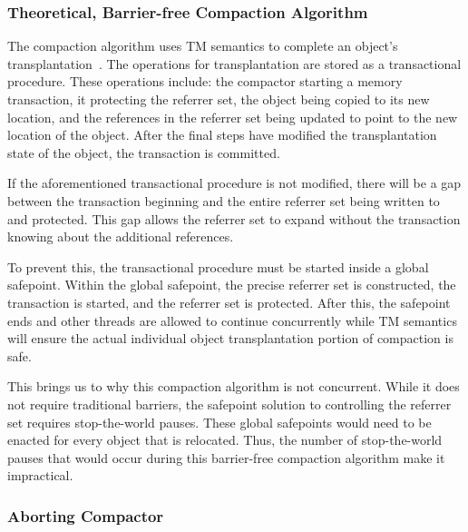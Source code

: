\documentclass{sig-alternate}
\begin{document}
\subsubsection{Theoretical, Barrier-free Compaction Algorithm}
\label{sec:collieAlgorithmNoBarriers}

The compaction algorithm uses TM semantics to complete an object's
transplantation~\cite{Iyengar:Collie}. The operations for transplantation are stored as a
transactional procedure. These operations include: the compactor 
starting a memory transaction, it protecting the referrer set, 
the object being copied to its new location, and the references in the 
referrer set being updated to point to the new location of the object.
After the final steps have modified the transplantation state of the object,
the transaction is committed.

If the aforementioned transactional procedure is not
modified, there will be a gap between the transaction beginning and
the entire referrer set being written to and protected. This gap allows 
the referrer set to expand without the transaction knowing about the 
additional references.

To prevent this, the transactional procedure must be started inside a global safepoint.
Within the global safepoint, the precise referrer
set is constructed, the transaction is started, and the referrer set is protected.
After this, the safepoint ends and other threads are allowed to continue concurrently
while TM semantics will ensure the actual individual object transplantation portion
of compaction is safe.

This brings us to why this compaction algorithm is not concurrent. 
While it does not require traditional barriers, the safepoint solution to
controlling the referrer set
requires stop-the-world pauses. These global safepoints would need to be enacted for every 
object that is relocated. Thus, the number of stop-the-world pauses that would occur
during this barrier-free compaction algorithm make it impractical.




\subsubsection{Aborting Compactor}
\label{sec:collieAbortion}
\end{document}
